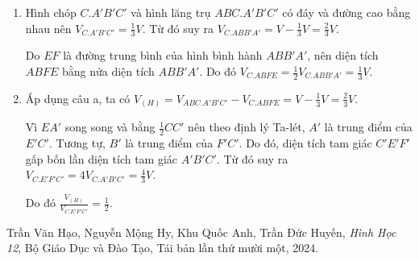 \documentclass[a4paper]{book}
\begin{document}
\begin{enumerate}[label=(\alph*)]
    \item Hình chóp $C.A'B'C'$ và hình lăng trụ $ABC.A'B'C'$ có đáy và đường cao bằng nhau nên $V_{C.A'B'C'} = \frac{1}{3} V$. Từ đó suy ra $V_{C.ABB'A'} = V - \frac{1}{3}V = \frac{2}{3} V$.
    
    Do $EF$ là đường trung bình của hình bình hành $ABB'A'$, nên diện tích $ABFE$ bằng nửa diện tích $ABB'A'$. Do đó $V_{C.ABFE} = \frac{1}{2} V_{C.ABB'A'} = \frac{1}{3} V$.
    
    \item Áp dụng câu a, ta có $V_{(H)} = V_{ABC.A'B'C'} - V_{C.ABFE} = V - \frac{1}{3} V = \frac{2}{3} V$.
    
    Vì $EA'$ song song và bằng $\frac{1}{2} CC'$ nên theo định lý Ta-lét, $A'$ là trung điểm của $E'C'$. Tương tự, $B'$ là trung điểm của $F'C'$. Do đó, diện tích tam giác $C'E'F'$ gấp bốn lần diện tích tam giác $A'B'C'$. Từ đó suy ra $V_{C.E'F'C'} = 4 V_{C.A'B'C'} = \frac{4}{3} V$.
    
    Do đó $\frac{V_{(H)}}{V_{C.E'F'C'}} = \frac{1}{2}$.
\end{enumerate}

\begin{thebibliography}{9}
Trần Văn Hạo, Nguyễn Mộng Hy, Khu Quốc Anh, Trần Đức Huyến,
\textit{Hình Học 12},
Bộ Giáo Dục và Đào Tạo, 
Tái bản lần thứ mười một, 2024.
\end{thebibliography}
\end{document}
